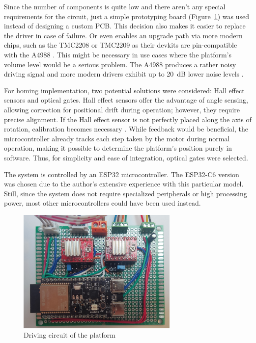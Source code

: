 Since the number of components is quite low and there aren't any special requirements for the circuit, just a simple prototyping board  (Figure~\ref{fig:circuit}) was used instead of designing a custom PCB.
This decision also makes it easier to replace the driver in case of failure.
Or even enables an upgrade path via more modern chips, such as the TMC2208 or TMC2209 as their devkits are pin-compatible with the A4988 \cite{a4988_sound}.
This might be necessary in use cases where the platform's volume level would be a serious problem.
The A4988 produces a rather noisy driving signal and more modern drivers exhibit up to 20~dB lower noise levels \cite{a4988_sound}.

For homing implementation, two potential solutions were considered: Hall effect sensors and optical gates.
Hall effect sensors offer the advantage of angle sensing, allowing correction for positional drift during operation; however, they require precise alignment.
If the Hall effect sensor is not perfectly placed along the axis of rotation, calibration becomes necessary \cite{hall}.
While feedback would be beneficial, the microcontroller already tracks each step taken by the motor during normal operation, making it possible to determine the platform's position purely in software.
Thus, for simplicity and ease of integration, optical gates were selected.

The system is controlled by an ESP32 microcontroller.
The ESP32-C6 version was chosen due to the author's extensive experience with this particular model.
Still, since the system does not require specialized peripherals or high processing power, most other microcontrollers could have been used instead.

\begin{figure}[h!]
	\centering
\includegraphics[width=0.7\textwidth]{../img/circuit.jpg}
	\caption[Driving circuit of the platform]{Driving circuit of the platform}
	\label{fig:circuit}
\end{figure}

